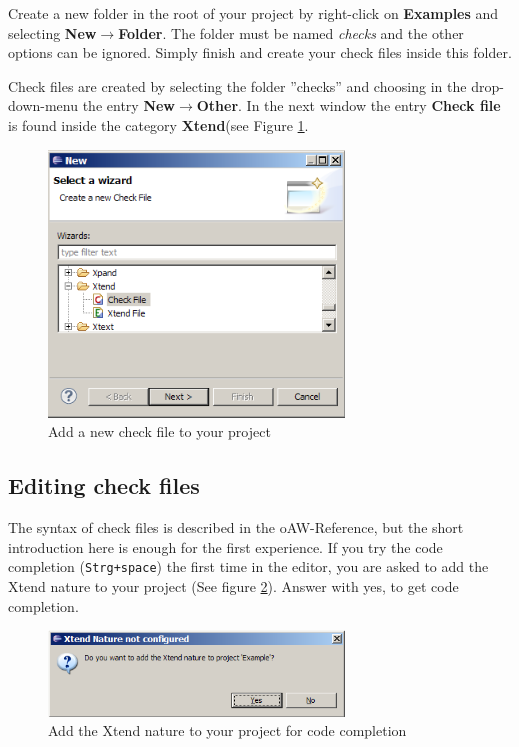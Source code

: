 Create a new folder in the root of your project by right-click on
\textbf{Examples}  and selecting \textbf{New}$\rightarrow$\textbf{Folder}. The
folder must be named \textit{checks} and the other options can be ignored. Simply
finish and create your check files inside this folder.

Check files are created by selecting the folder ''checks'' and choosing in the
drop-down-menu the entry \textbf{New}$\rightarrow$\textbf{Other}. In the next
window the entry \textbf{Check file} is found inside the category
\textbf{Xtend}(see Figure \ref{fig:newCheckFile}.

\begin{figure}[ht] \center
\includegraphics[width=0.7\textwidth]{./Pictures/newoAWCheckFile}
\caption{\label{fig:newCheckFile}Add a new check file to your project}
\end{figure}

\subsection{Editing check files}
The syntax of check files is described in the oAW-Reference, but the short
introduction here is enough for the first experience. If you try the code
completion (\texttt{Strg+space}) the first time in the editor, you are asked to
add the Xtend nature to your project (See figure \ref{fig:addOAWNature}). Answer
with yes, to get code completion. \begin{figure}[ht] \center
\includegraphics[width=0.7\textwidth]{./Pictures/addoAWNature}
\caption{\label{fig:addOAWNature}Add the Xtend nature to your project for code completion}
\end{figure}

